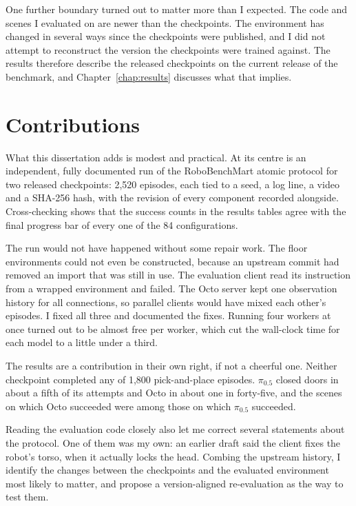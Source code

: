One further boundary turned out to matter more than I expected. The code and scenes I evaluated on are newer than the checkpoints. The environment has changed in several ways since the checkpoints were published, and I did not attempt to reconstruct the version the checkpoints were trained against. The results therefore describe the released checkpoints on the current release of the benchmark, and Chapter~\ref{chap:results} discusses what that implies.

\section{Contributions}

What this dissertation adds is modest and practical. At its centre is an independent, fully documented run of the RoboBenchMart atomic protocol for two released checkpoints: 2,520 episodes, each tied to a seed, a log line, a video and a SHA-256 hash, with the revision of every component recorded alongside. Cross-checking shows that the success counts in the results tables agree with the final progress bar of every one of the 84 configurations.

The run would not have happened without some repair work. The floor environments could not even be constructed, because an upstream commit had removed an import that was still in use. The evaluation client read its instruction from a wrapped environment and failed. The Octo server kept one observation history for all connections, so parallel clients would have mixed each other's episodes. I fixed all three and documented the fixes. Running four workers at once turned out to be almost free per worker, which cut the wall-clock time for each model to a little under a third.

The results are a contribution in their own right, if not a cheerful one. Neither checkpoint completed any of 1,800 pick-and-place episodes. $\pi_{0.5}$ closed doors in about a fifth of its attempts and Octo in about one in forty-five, and the scenes on which Octo succeeded were among those on which $\pi_{0.5}$ succeeded.

Reading the evaluation code closely also let me correct several statements about the protocol. One of them was my own: an earlier draft said the client fixes the robot's torso, when it actually locks the head. Combing the upstream history, I identify the changes between the checkpoints and the evaluated environment most likely to matter, and propose a version-aligned re-evaluation as the way to test them.

